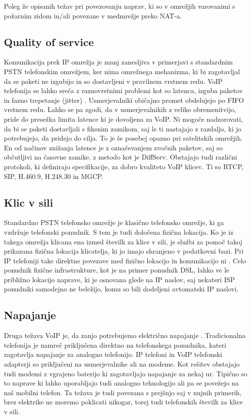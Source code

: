 \documentclass{acm_proc_article-sp}
\begin{document}
Poleg že opisanih težav pri povezovanju naprav, ki so v omrežjih varovanimi s požarnim zidom in/ali povezane v medmrežje preko NAT-a.

\subsection{Quality of service}
Komunikacija prek IP omrežja je manj zanesljiva v primerjavi s standardnim PSTN telefonskim omrežjem, ker nima omrežnega mehanizma, ki bi zagotavljal da se paketi ne izgubijo in so dostavljeni v pravilnem vrstnem redu. VoIP telefonija se lahko sreča z raznovrstnimi problemi kot so latenca, izguba paketov in fazno trepetanje (jitter) \cite{QOS}.
Usmerjevalniki običajno promet obdelujejo po FIFO vrstnem redu. Lahko se pa zgodi, da v usmerjevalnikih z veliko obremenitvijo, pride do presežka limita latence ki je dovoljena za VoIP. Ni mogoče nadzorovati, da bi se paketi dostavljali s fiksnim zamikom, saj le ti nastajajo z razdaljo, ki jo potrebujejo, da pridejo do cilja. To je še posebej opazno pri satelitskih omrežjih. En od načinov znižanja latence je z označevanjem zvočnih paketov, saj so občutljivi na časovne zamike, z metodo kot je DiffServ. Obstajajo tudi različni protokoli, ki definirajo specifikacije, za dobro kvaliteto VoIP klicev. Ti so RTCP, SIP, H.460.9, H.248.30 in MGCP.

\subsection{Klic v sili}
Standardno PSTN telefonsko omrežje je klasično telefonsko omrežje, ki ga vzdržuje telefonski ponudnik. S tem je tudi določena fizična lokacija. Ko je iz takega omrežja klicana ena izmed številk za klice v sili, je službi za pomoč takoj prikazana fizična lokacija klicatelja, ki jo imajo shranjeno v podatkovni bazi. Pri IP telefoniji take direktne povezave med fizično lokacijo in komunikacijo ni \cite{PROBLEMS}. Celo ponudnik fizične infrastrukture, kot je na primer ponudnik DSL, lahko ve le približno lokacijo naprave, ki je osnovana glede na IP naslov, saj nekateri ISP ponudniki samodejno ne beležijo, komu so bili dodeljeni avtomatski IP naslovi.

\subsection{Napajanje}
Druga težava VoIP je, da zanjo potrebujemo električno napajanje \cite{PROBLEMS}. Tradicionalna telefonija je namreč priključena direktno na telefonskega ponudnika, kateri zagotavlja napajanje za analogno telefonijo. IP telefoni in VoIP telefonski adapterji so priključeni na usmerjevalnike ali na modeme. Kot rešitev obstajajo tudi modemi z vgrajeno baterijo ki zagotavljajo napajanje za nekaj ur. Tipično so to naprave ki lahko uporabljajo tudi analogno tehnologijo ali pa se povežejo na naš mobilni telefon. Ta težava je tudi povezana s prejšnjo saj v nujnih primerih, brez elektrike ne moremo poklicati nikogar, torej tudi telefonskih številk za klice v sili.
\end{document}

